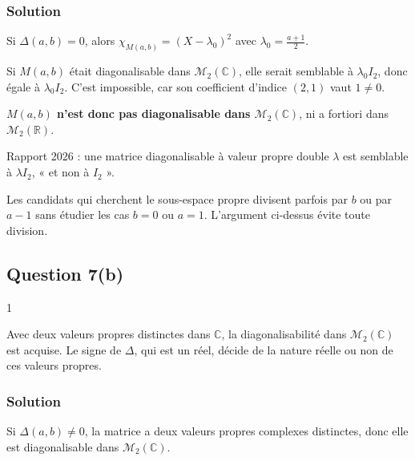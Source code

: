 \documentclass[11pt,a4paper]{article}
\begin{document}
\hypertarget{solution-7}{%
\subsubsection{Solution}\label{solution-7}}

Si \(\Delta(a,b)=0\), alors \(\chi_{M(a,b)}=(X-\lambda_0)^2\) avec \(\lambda_0=\frac{a+1}2\).

Si \(M(a,b)\) était diagonalisable dans \({\mathcal{M}}_2(\mathbb{C})\), elle serait semblable à \(\lambda_0I_2\), donc égale à \(\lambda_0I_2\). C'est impossible, car son coefficient d'indice \((2,1)\) vaut \(1\neq0\).

\textbf{\(M(a,b)\) n'est donc pas diagonalisable dans \({\mathcal{M}}_2(\mathbb{C})\)}, ni a fortiori dans \({\mathcal{M}}_2(\mathbb{R})\).

\begin{piege}

Rapport 2026 : une matrice diagonalisable à valeur propre double \(\lambda\) est semblable à \(\lambda I_2\), « et non à \(I_2\) ».

Les candidats qui cherchent le sous-espace propre divisent parfois par \(b\) ou par \(a-1\) sans étudier les cas \(b=0\) ou \(a=1\). L'argument ci-dessus évite toute division.

\end{piege}

\hypertarget{question-7b}{%
\subsection{Question 7(b)}\label{question-7b}}

\begin{indication}{1}

Avec deux valeurs propres distinctes dans \(\mathbb{C}\), la diagonalisabilité dans \({\mathcal{M}}_2(\mathbb{C})\) est acquise. Le signe de \(\Delta\), qui est un réel, décide de la nature réelle ou non de ces valeurs propres.

\end{indication}

\hypertarget{solution-8}{%
\subsubsection{Solution}\label{solution-8}}

Si \(\Delta(a,b)\neq0\), la matrice a deux valeurs propres complexes distinctes, donc elle est diagonalisable dans \({\mathcal{M}}_2(\mathbb{C})\).
\end{document}
